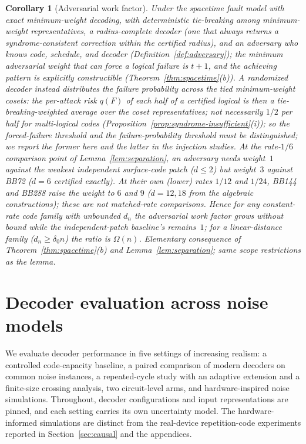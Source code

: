 \documentclass[pdflatex,sn-mathphys-num]{sn-jnl}
\theoremstyle{thmstyleone}
\newtheorem{corollary}[theorem]{Corollary}
\theoremstyle{thmstyletwo}
\theoremstyle{thmstylethree}
\begin{document}
\begin{corollary}[Adversarial work factor]\label{cor:workfactor}
Under the spacetime fault model with exact minimum-weight decoding, with \emph{deterministic tie-breaking} among minimum-weight representatives, a \emph{radius-complete} decoder (one that always returns a syndrome-consistent correction within the certified radius), and an adversary who \emph{knows} code, schedule, and decoder (Definition~\ref{def:adversary}); the minimum adversarial weight that can force a logical failure is $t{+}1$, and the achieving pattern is explicitly constructible (Theorem~\ref{thm:spacetime}(b)). A randomized decoder instead distributes the failure probability across the tied minimum-weight cosets: the per-attack risk $q(F)$ of each half of a certified logical is then a tie-breaking-weighted average over the coset representatives; not necessarily $1/2$ per half for multi-logical codes (Proposition~\ref{prop:syndrome-insufficient}(i)); so the \emph{forced}-failure threshold and the \emph{failure-probability} threshold must be distinguished; we report the former here and the latter in the injection studies. At the rate-$1/6$ comparison point of Lemma~\ref{lem:separation}, an adversary needs weight~$1$ against the weakest independent surface-code patch ($d\le2$) but weight~$3$ against BB72 ($d=6$ certified exactly). At their own (lower) rates $1/12$ and $1/24$, BB144 and BB288 raise the weight to $6$ and $9$ ($d=12,18$ from the algebraic constructions); these are not matched-rate comparisons. Hence for any constant-rate code family with unbounded $d_n$ the adversarial work factor grows without bound while the independent-patch baseline's remains~$1$; for a linear-distance family ($d_n\ge\delta_0 n$) the ratio is $\Omega(n)$. \emph{Elementary consequence of Theorem~\ref{thm:spacetime}(b) and Lemma~\ref{lem:separation}; same scope restrictions as the lemma.}
\end{corollary}

\section{Decoder evaluation across noise models}

We evaluate decoder performance in five settings of increasing realism: a controlled code-capacity baseline, a paired comparison of modern decoders on common noise instances, a repeated-cycle study with an adaptive extension and a finite-size crossing analysis, two circuit-level arms, and hardware-inspired noise simulations. Throughout, decoder configurations and input representations are pinned, and each setting carries its own uncertainty model. The hardware-informed simulations are distinct from the real-device repetition-code experiments reported in Section~\ref{sec:causal} and the appendices.
\end{document}
